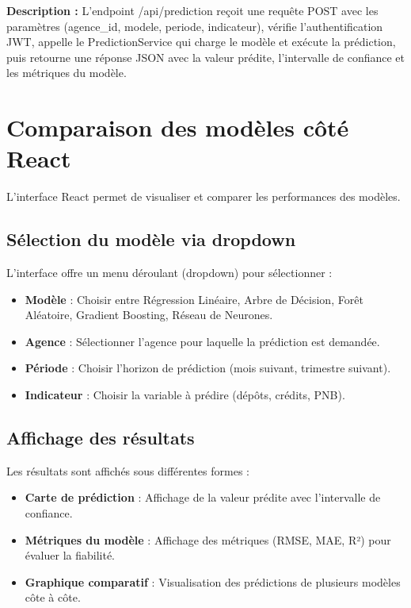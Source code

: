 \textbf{Description :} L'endpoint /api/prediction reçoit une requête POST avec les paramètres (agence\_id, modele, periode, indicateur), vérifie l'authentification JWT, appelle le PredictionService qui charge le modèle et exécute la prédiction, puis retourne une réponse JSON avec la valeur prédite, l'intervalle de confiance et les métriques du modèle.

\section{Comparaison des modèles côté React}
\label{sec:sprint5-react-comparison}

L'interface React permet de visualiser et comparer les performances des modèles.

\subsection{Sélection du modèle via dropdown}

L'interface offre un menu déroulant (dropdown) pour sélectionner :

\begin{itemize}
    \item \textbf{Modèle} : Choisir entre Régression Linéaire, Arbre de Décision, Forêt Aléatoire, Gradient Boosting, Réseau de Neurones.
    \item \textbf{Agence} : Sélectionner l'agence pour laquelle la prédiction est demandée.
    \item \textbf{Période} : Choisir l'horizon de prédiction (mois suivant, trimestre suivant).
    \item \textbf{Indicateur} : Choisir la variable à prédire (dépôts, crédits, PNB).
\end{itemize}

\subsection{Affichage des résultats}

Les résultats sont affichés sous différentes formes :

\begin{itemize}
    \item \textbf{Carte de prédiction} : Affichage de la valeur prédite avec l'intervalle de confiance.
    \item \textbf{Métriques du modèle} : Affichage des métriques (RMSE, MAE, R²) pour évaluer la fiabilité.
    \item \textbf{Graphique comparatif} : Visualisation des prédictions de plusieurs modèles côte à côte.
\end{itemize}

